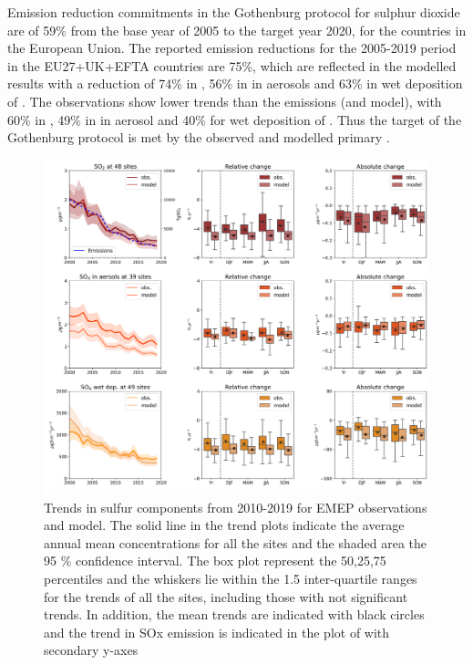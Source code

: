 Emission reduction commitments in the Gothenburg protocol for sulphur dioxide are of 59\% from the base year of 2005 to the target year 2020, for the countries in the European Union. The reported emission reductions for the 2005-2019 period in the EU27+UK+EFTA countries are 75\%, which are reflected in the modelled results with a reduction of 74\% in \soii, 56\% in \soiv in aerosols and 63\% in wet deposition of \soiv. The observations show lower trends than the emissions (and model), with 60\% in \soii, 49\% in \soiv in aerosol and 40\% for wet deposition of \soiv. Thus the target of the Gothenburg protocol is met by the observed and modelled primary \soii.



\begin{figure}[h]
	\centering
	\includegraphics[width=0.74\paperwidth]{FIGS_TRENDS/sulfur_trends.png}
	\caption{\label{fig:SOx_trends}Trends in sulfur components from 2010-2019 for EMEP observations and model. The solid line in the trend plots indicate the average annual mean concentrations for all the sites and the shaded area the 95 \% confidence interval. The box plot represent the 50,25,75 percentiles and the whiskers lie within the 1.5 inter-quartile ranges for the trends of all the sites, including those with not significant trends. In addition, the mean trends are indicated with black circles and the trend in SOx emission is indicated in the plot of \soii with secondary y-axes}
\end{figure}

